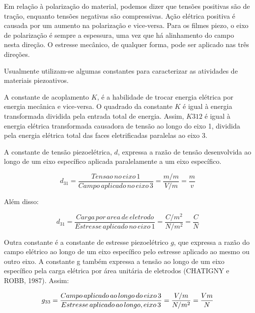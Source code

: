 \documentclass[
	12pt,				
	oneside,			
	a4paper,			
	english,			
	brazil,	
	sumario=abnt-6027-2012		
	]{abntex2ppgsi}
\begin{document}
Em relação à polarização do material, podemos dizer que tensões positivas são de tração, enquanto tensões negativas são compressivas. Ação elétrica positiva é causada por um aumento na polarização e vice-versa. Para os filmes piezo, o eixo de polarização é sempre a espessura, uma vez que há alinhamento do campo nesta direção. O estresse mecânico, de qualquer forma, pode ser aplicado nas três direções. 

Usualmente utilizam-se algumas constantes para caracterizar as atividades de materiais piezoativos. 

A constante de acoplamento $K$, é a habilidade de trocar energia elétrica por energia mecânica e vice-versa. O quadrado da constante $K$ é igual à energia transformada dividida pela entrada total de energia. Assim, $K312$ é igual à energia elétrica transformada causadora de tensão ao longo do eixo 1, dividida pela energia elétrica total das faces eletrificadas paralelas ao eixo 3. 

A constante de tensão piezoelétrica, $d$, expressa a razão de tensão desenvolvida ao longo de um eixo específico aplicada paralelamente a um eixo específico. 

\begin{equation}
	d_{31} = \frac{Tensao \,no \,eixo \,1}{Campo \,aplicado \,no \,eixo \,3} = \frac{m/m}{V/m} = \frac{m}{v}
	\label{eq: Constante de Tensão Piezoelétrica}
\end{equation}



Além disso:

\begin{equation}
	d_{31} = \frac{Carga \,por \,area \,de \,eletrodo}{Estresse \,aplicado \,no \,eixo \,1} = \frac{C/m^{2}}{N/m^{2}} = \frac{C}{N}
	\label{eq: Boa pergunta}
\end{equation}

Outra constante é a constante de estresse piezoelétrico $g$, que expressa a razão do campo elétrico ao longo de um eixo específico pelo estresse aplicado ao mesmo ou outro eixo. A constante g também expressa a tensão ao longo de um eixo específico pela carga elétrica por área unitária de eletrodos (CHATIGNY e ROBB, 1987). Assim:

\begin{equation}
	g_{33} = \frac{Campo \,aplicado \,ao \,longo \,do \,eixo \,3}{Estresse \,aplicado \,ao \,longo ,\do \,eixo \,3} = \frac{V/m}{N/m^{2}} = \frac{Vm}{N}
	\label{eq: Constante G, expressando a razão do campo elétrico ao longo do eixo.}
\end{equation}
\end{document}

